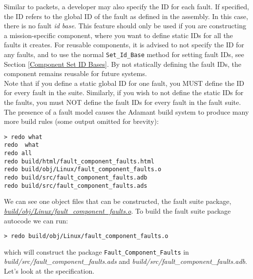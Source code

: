 Similar to packets, a developer may also specify the ID for each fault. If specified, the ID refers to the global ID of the fault as defined in the assembly. In this case, there is no fault \textit{id base}. This feature should only be used if you are constructing a mission-specific component, where you want to define static IDs for all the faults it creates. For reusable components, it is advised to not specify the ID for any faults, and to use the normal \texttt{Set\_Id\_Base} method for setting fault IDs, see Section \ref{Component Set ID Bases}. By not statically defining the fault IDs, the component remains reusable for future systems. \\

Note that if you define a static global ID for one fault, you MUST define the ID for every fault in the suite. Similarly, if you wish to not define the static IDs for the faults, you must NOT define the fault IDs for every fault in the fault suite. \\

The presence of a fault model causes the Adamant build system to produce many more build rules (some output omitted for brevity):

\vspace{5mm} %
\begin{verbatim}
> redo what 
redo  what
redo all
redo build/html/fault_component_faults.html
redo build/obj/Linux/fault_component_faults.o
redo build/src/fault_component_faults.adb
redo build/src/fault_component_faults.ads
\end{verbatim}
\vspace{5mm} %

We can see one object files that can be constructed, the fault suite package, \textit{\url{build/obj/Linux/fault\_component\_faults.o}}. To build the fault suite package autocode we can run:

\vspace{5mm} %
\begin{verbatim}
> redo build/obj/Linux/fault_component_faults.o
\end{verbatim}
\vspace{5mm} %

which will construct the package \texttt{Fault\_Component\_Faults} in \textit{build/src/fault\_component\_faults.ads} and \textit{build/src/fault\_component\_faults.adb}. Let's look at the specification. \\

